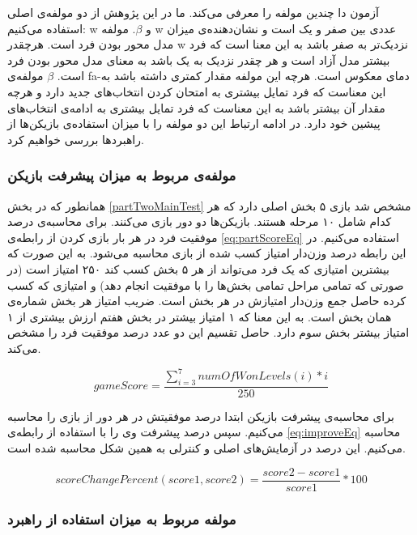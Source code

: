\documentclass[twoside, a4paper,11pt]{book}
\numberwithin{equation}{chapter}
\numberwithin{table}{chapter}
\numberwithin{figure}{chapter}
\numberwithin{equation}{chapter}
\newcommand{\mls}[1]{\gls{fa-#1}\glsuseri{la-#1}}
\begin{document}
آزمون دا چندین مولفه را معرفی می‌کند. ما در این پژوهش از دو مولفه‌ی اصلی استفاده می‌کنیم: w و $\beta$. مولفه w عددی بین صفر و یک است و نشان‌دهنده‌ی میزان مدل محور بودن فرد است. هرچقدر w نزدیک‌تر به صفر باشد به این معنا است که فرد بیشتر مدل آزاد است و هر چقدر نزدیک به یک باشد به معنای مدل محور بودن فرد است. $\beta$ مولفه‌ی \mls{دمای معکوس} است. هرچه این مولفه مقدار کمتری داشته باشد به این معناست که فرد تمایل بیشتری به امتحان کردن انتخاب‌های جدید دارد و هرچه مقدار آن بیشتر باشد به این معناست که فرد تمایل بیشتری به ادامه‌ی انتخاب‌های پیشین خود دارد. در ادامه ارتباط این دو مولفه را با میزان استفاده‌ی بازیکن‌ها از راهبردها بررسی خواهیم کرد. 


\subsubsection{مولفه‌ی مربوط به میزان پیشرفت بازیکن}
همانطور که در بخش \ref{partTwoMainTest} مشخص شد بازی ۵ بخش اصلی دارد که هر کدام شامل ۱۰ مرحله هستند. بازیکن‌ها دو دور بازی می‌کنند. برای محاسبه‌ی درصد موفقیت فرد در هر بار بازی کردن از رابطه‌ی \ref{eq:partScoreEq} استفاده می‌کنیم. در این رابطه درصد وزن‌دار امتیاز کسب شده از بازی محاسبه می‌شود. به این صورت که بیشترین امتیازی که یک فرد می‌تواند از هر ۵ بخش کسب کند ۲۵۰ امتیاز است (در صورتی که تمامی مراحل تمامی بخش‌ها را با موفقیت انجام دهد) و امتیازی که کسب کرده حاصل جمع وزن‌دار امتیازش در هر بخش است. ضریب امتیاز هر بخش شماره‌ی همان بخش است. به این معنا که ۱ امتیاز بیشتر در بخش هفتم ارزش بیشتری از ۱ امتیاز بیشتر بخش سوم دارد. حاصل تقسیم این دو عدد درصد موفقیت فرد را مشخص می‌کند.

\begin{equation}
\label{eq:partScoreEq}
	gameScore = \frac{\sum_{i=3}^{7} numOfWonLevels(i)*i }{250}
\end{equation}

برای محاسبه‌ی پیشرفت بازیکن ابتدا درصد موفقیتش در هر دور از بازی را محاسبه می‌کنیم. سپس درصد پیشرفت وی را با استفاده از رابطه‌ی \ref{eq:improveEq} محاسبه می‌کنیم. این درصد در آزمایش‌های اصلی و کنترلی به همین شکل محاسبه شده است.

\begin{equation}
\label{eq:improveEq}
	scoreChangePercent(score1, score2) = \frac{score2 - score1}{score1}*100
\end{equation}

\subsubsection{مولفه مربوط به میزان استفاده از راهبرد}
\end{document}
